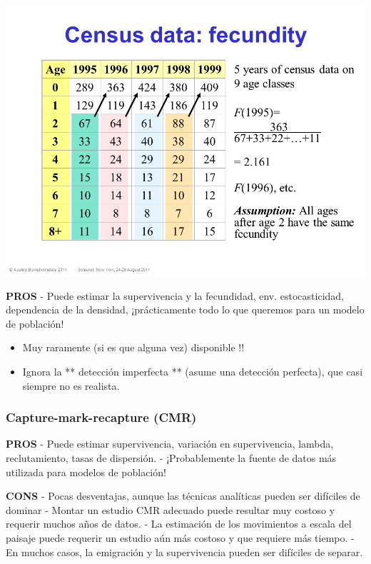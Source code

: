 \documentclass[
]{article}
\providecommand{\tightlist}{%
  \setlength{\itemsep}{0pt}\setlength{\parskip}{0pt}}
\begin{document}
\includegraphics{figures/census3.png}

\textbf{PROS} - Puede estimar la supervivencia y la fecundidad, env.
estocasticidad, dependencia de la densidad, ¡prácticamente todo lo que
queremos para un modelo de población!

\begin{itemize}
\tightlist
\item
  Muy raramente (si es que alguna vez) disponible !!
\item
  Ignora la ** detección imperfecta ** (asume una detección perfecta),
  que casi siempre no es realista.
\end{itemize}

\hypertarget{capture-mark-recapture-cmr}{%
\subsubsection{Capture-mark-recapture
(CMR)}\label{capture-mark-recapture-cmr}}

\textbf{PROS} - Puede estimar supervivencia, variación en supervivencia,
lambda, reclutamiento, tasas de dispersión. - ¡Probablemente la fuente
de datos más utilizada para modelos de población!

\textbf{CONS} - Pocas desventajas, aunque las técnicas analíticas pueden
ser difíciles de dominar - Montar un estudio CMR adecuado puede resultar
muy costoso y requerir muchos años de datos. - La estimación de los
movimientos a escala del paisaje puede requerir un estudio aún más
costoso y que requiere más tiempo. - En muchos casos, la emigración y la
supervivencia pueden ser difíciles de separar.
\end{document}

